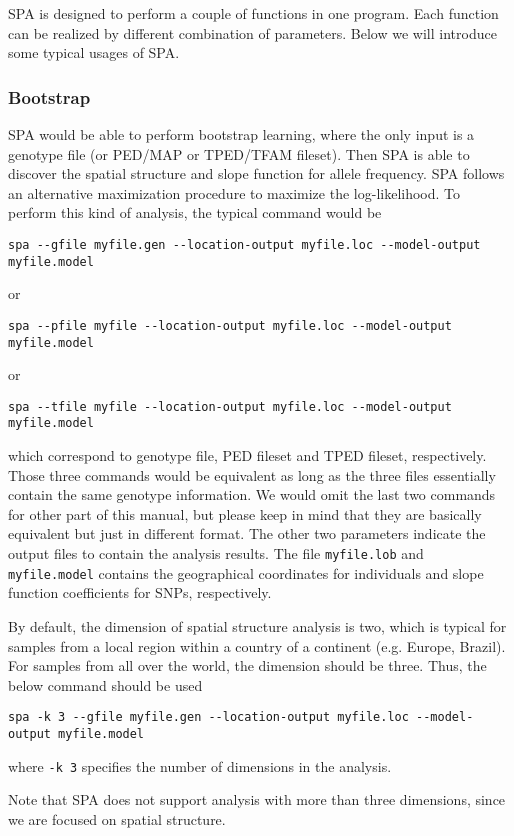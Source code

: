 \documentclass[12pt]{article}
\begin{document}
SPA is designed to perform a couple of functions in one program. Each function can be realized by
different combination of parameters. Below we will introduce some typical usages of SPA. 


\subsubsection*{Bootstrap}
SPA would be able to perform bootstrap learning, where the only input is a genotype file
(or PED/MAP or TPED/TFAM fileset). Then SPA is able to discover the spatial structure and slope
function for allele frequency. SPA follows an alternative maximization procedure to maximize the
log-likelihood. To perform this kind of analysis, the typical command would be
\begin{verbatim}
spa --gfile myfile.gen --location-output myfile.loc --model-output myfile.model
\end{verbatim} 
or
\begin{verbatim}
spa --pfile myfile --location-output myfile.loc --model-output myfile.model
\end{verbatim} 
or
\begin{verbatim}
spa --tfile myfile --location-output myfile.loc --model-output myfile.model
\end{verbatim} 
which correspond to genotype file, PED fileset and TPED fileset, respectively.
Those three commands would be equivalent as long as the three files essentially contain the same
genotype information. We would omit the last two commands for other part of this manual, but please
keep in mind that they are basically equivalent but just in different format.
The other two parameters
indicate the output files to contain the analysis results. The file \verb+myfile.lob+ and
\verb+myfile.model+ contains the geographical coordinates for individuals and slope function
coefficients for SNPs, respectively.

By default, the dimension of spatial structure analysis is two, which is typical for samples from a
local region within a country of a continent (e.g. Europe, Brazil). For samples from all over the
world, the dimension should be three. Thus, the below command should be used
\begin{verbatim}
spa -k 3 --gfile myfile.gen --location-output myfile.loc --model-output myfile.model
\end{verbatim} 
where \verb+-k 3+ specifies the number of dimensions in the analysis. 

Note that SPA does not support analysis with more than three dimensions, since we are focused on
spatial structure. 
\end{document}
